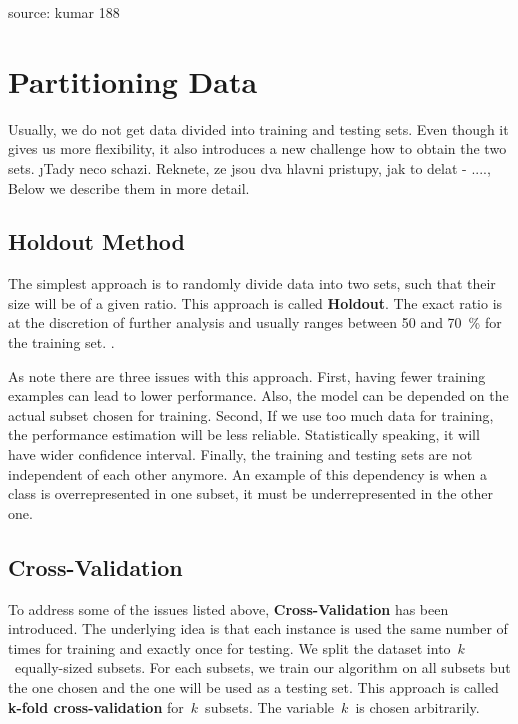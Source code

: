 {source: kumar 188}


\section{Partitioning Data}

Usually, we do not get data divided into training and testing sets.
Even though it gives us more flexibility, it also introduces a new challenge how to obtain the two sets.
\j{Tady neco schazi. Reknete, ze jsou dva hlavni pristupy, jak to delat - ...., Below we describe them in more detail.}

\subsection{Holdout Method}

The simplest approach is to randomly divide data into two sets, such that their size will be of a given ratio.
This approach is called {\bf Holdout}.
The exact ratio is at the discretion of further analysis and usually ranges between 50 and 70~\% for the training set. . 

As \citet{TanBachKum08} note there are three issues with this approach.
First, having fewer training examples can lead to lower performance.
Also, the model can be depended on the actual subset chosen for training.
Second, If  we use too much data for training, the performance estimation  will be less reliable.
Statistically speaking, it will have wider confidence interval.
Finally, the training and testing sets are not independent of each other anymore.
An example of this dependency is when a class is overrepresented in one subset, it must be underrepresented in the other one.

\subsection{Cross-Validation}

To address some of the issues listed above, {\bf Cross-Validation} has been introduced.
The underlying idea is that each instance is used the same number of times for training and exactly once for testing.
We split the dataset into~$k$~equally-sized subsets.
For each subsets, we train our algorithm on all subsets but the one chosen and the one will be used as a testing set.
This approach is called {\bf k-fold cross-validation} for~$k$~subsets. The variable~$k$~is chosen arbitrarily.

